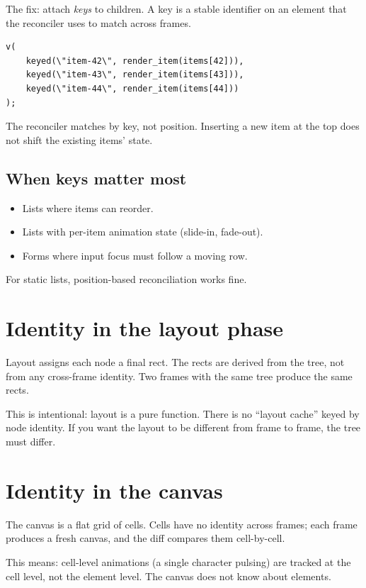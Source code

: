 The fix: attach \emph{keys} to children. A key is a stable
identifier on an element that the reconciler uses to match
across frames.

\begin{lstlisting}
v(
    keyed(\"item-42\", render_item(items[42])),
    keyed(\"item-43\", render_item(items[43])),
    keyed(\"item-44\", render_item(items[44]))
);
\end{lstlisting}

The reconciler matches by key, not position. Inserting a new
item at the top does not shift the existing items' state.

\subsection*{When keys matter most}

\begin{itemize}[leftmargin=*]
  \item Lists where items can reorder.
  \item Lists with per-item animation state (slide-in,
    fade-out).
  \item Forms where input focus must follow a moving row.
\end{itemize}

For static lists, position-based reconciliation works fine.

\section{Identity in the layout phase}

Layout assigns each node a final rect. The rects are derived
from the tree, not from any cross-frame identity. Two frames
with the same tree produce the same rects.

This is intentional: layout is a pure function. There is no
``layout cache'' keyed by node identity. If you want the layout
to be different from frame to frame, the tree must differ.

\section{Identity in the canvas}

The canvas is a flat grid of cells. Cells have no identity
across frames; each frame produces a fresh canvas, and the diff
compares them cell-by-cell.

This means: cell-level animations (a single character pulsing)
are tracked at the cell level, not the element level. The
canvas does not know about elements.


